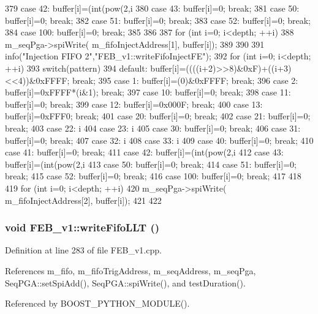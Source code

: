 \begin{DoxyCode}
{{{379     case 42:  buffer[i]=(int(pow(2,i%
380     case 43:  buffer[i]=0; break;
381     case 50:  buffer[i]=0; break;
382     case 51:  buffer[i]=0; break;
383     case 52:  buffer[i]=0; break;
384     case 100: buffer[i]=0; break;
385    }
386    }
387   for (int i=0; i<depth; ++i){
388     m_seqPga->spiWrite( m_fifoInjectAddress[1], buffer[i]);
389   }
390   
391   info("Injection FIFO 2","FEB_v1::writeFifoInjectFE");        
392   for (int i=0; i<depth; ++i){ 
393     switch(pattern){
394     default:  buffer[i]=((((i+2)>>8)&0xF)+((i+3)<<4))&0xFFFF; break;
395     case 1:   buffer[i]=(0)&0xFFFF; break;
396     case 2:   buffer[i]=0xFFFF*(i&1); break;
397     case 10:  buffer[i]=0; break;
398     case 11:  buffer[i]=0; break;
399     case 12:  buffer[i]=0x000F; break;
400     case 13:  buffer[i]=0xFFF0; break;
401     case 20:  buffer[i]=0; break;
402     case 21:  buffer[i]=0; break;
403     case 22:  i%
404     case 23:  i%
405     case 30:  buffer[i]=0; break;
406     case 31:  buffer[i]=0; break;
407     case 32:  i%
408     case 33:  i%
409     case 40:  buffer[i]=0; break;
410     case 41:  buffer[i]=0; break;
411     case 42:  buffer[i]=(int(pow(2,i%
412     case 43:  buffer[i]=(int(pow(2,i%
413     case 50:  buffer[i]=0; break;
414     case 51:  buffer[i]=0; break;
415     case 52:  buffer[i]=0; break;
416     case 100: buffer[i]=0; break;    
417     }
418    }  
419   for (int i=0; i<depth; ++i){
420     m_seqPga->spiWrite( m_fifoInjectAddress[2], buffer[i]);
421   }
422 }
\end{DoxyCode}
\hypertarget{classFEB__v1_a0e88b14453100c97b5962e8a6b0f48bf}{
\subsubsection[{writeFifoLLT}]{\setlength{\rightskip}{0pt plus 5cm}void FEB\_\-v1::writeFifoLLT ()}}
\label{classFEB__v1_a0e88b14453100c97b5962e8a6b0f48bf}


Definition at line 283 of file FEB\_\-v1.cpp.

References m\_\-fifo, m\_\-fifoTrigAddress, m\_\-seqAddress, m\_\-seqPga, SeqPGA::setSpiAdd(), SeqPGA::spiWrite(), and testDuration().

Referenced by BOOST\_\-PYTHON\_\-MODULE().


